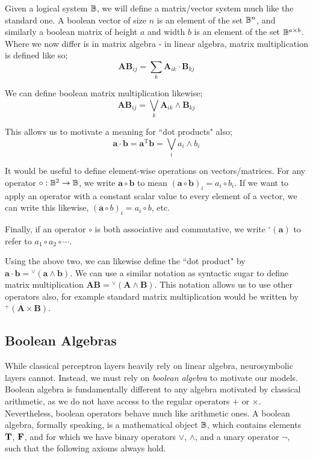Given a logical system $\mathbb{B}$, we will define a matrix/vector system much like the standard one. A boolean vector of size $n$ is an element of the set $\mathbb{B}^n$, and similarly a boolean matrix of height $a$ and width $b$ is an element of the set $\mathbb{B}^{a \times b}$. Where we now differ is in matrix algebra - in linear algebra, matrix multiplication is defined like so;
$$\mathbf{AB}_{ij} = \sum_{k}\mathbf{A}_{ik}\cdot\mathbf{B}_{kj}$$

We can define boolean matrix multiplication likewise;
$$\mathbf{AB}_{ij} = \bigvee_{k}\mathbf{A}_{ik}\land\mathbf{B}_{kj}$$

This allows us to motivate a meaning for ``dot products" also;
$$\mathbf{a\cdot b} = \mathbf{a}^\text{T}\mathbf{b} = \bigvee_i a_i \land b_i$$

It would be useful to define element-wise operations on vectors/matrices. For any operator $\circ : \mathbb{B}^2 \to \mathbb{B}$, we write $\mathbf{a} \circ \mathbf{b}$ to mean $(\mathbf{a} \circ \mathbf{b})_i = a_i \circ b_i$. If we want to apply an operator with a constant scalar value to every element of a vector, we can write this likewise, $(\mathbf{a} \circ b)_i = a_i \circ b$, etc.

Finally, if an operator $\circ$ is both associative and commutative, we write $^\circ(\mathbf{a})$ to refer to $a_1 \circ a_2 \circ \cdots$.

Using the above two, we can likewise define the ``dot product" by $\mathbf{a \cdot b} ={^\lor}(\mathbf{a \land b})$. We can use a similar notation as syntactic sugar to define matrix multiplication $\mathbf{AB} ={^\lor}(\mathbf{A \land B})$. This notation allows us to use other operators also, for example standard matrix multiplication would be written by ${^+}(\mathbf{A \times B})$. 

\subsection{Boolean Algebras}

While classical perceptron layers heavily rely on linear algebra, neurosymbolic layers cannot. Instead, we must rely on \textit{boolean algebra} to motivate our models. Boolean algebra is fundamentally different to any algebra motivated by classical arithmetic, as we do not have access to the regular operators $+$ or $\times$. Nevertheless, boolean operators behave much like arithmetic ones. A boolean algebra, formally speaking, is a mathematical object $\mathbb{B}$, which contains elements $\textbf{T}$, $\textbf{F}$, and for which we have binary operators $\lor$, $\land$, and a unary operator $\neg$, such that the following axioms always hold.

